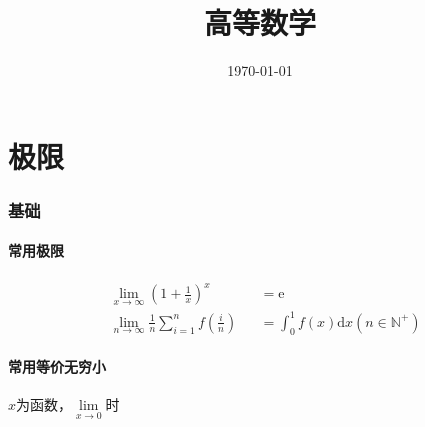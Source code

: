 \documentclass{article}
\title{高等数学}
\author{}
\date{\today}
\begin{document}
\hypersetup{
    hidelinks,
    allcolors = black,
    breaklinks = true
}

\newtheorem{definition}{Definition}[subsection]
\newtheorem{theorem}{Theorem}[subsection]
\newtheorem{corollary}{Corollary}[theorem]
\renewcommand{\proofname}{\indent\bf Proof}

\def\e{\mathrm e}
\def\i{\mathrm i}
\def\d{\mathrm d}
\def\C{\mathrm C}
\def\div{\mathrm{div}}
\def\rot{\mathrm{rot}}
\def\vecv{\vec{\mathrm v}}
\def\sr{\mathbb R}
\def\sn{\mathbb N}
\def\snp{\mathbb N^+}
\def\sc{\mathbb C}
\def\sz{\mathbb Z}

\newcommand{\abs}[1]{\left|#1\right|}
\newcommand{\pare}[1]{\left(#1\right)}
\newcommand{\jacobi}[2]{\frac{\partial\pare{#1}}{\partial\pare{#2}}}

\begin{titlepage}
    \maketitle
\end{titlepage}

\tableofcontents
\newpage

\part{极限}

\section{基础}

\subsection{常用极限}

\[\begin{aligned}
         & \lim_{x\to\infty}{\pare{1+\frac1x}^x}                  &  & =\e                                  \\
         & \lim_{n\to\infty}{\frac1n\sum_{i=1}^nf\pare{\frac in}} &  & =\int_0^1f\pare x\d x\pare{n\in\snp}
    \end{aligned}\]

\subsection{常用等价无穷小}

$x$为函数，$\lim\limits_{x\to0}$时
\end{document}
